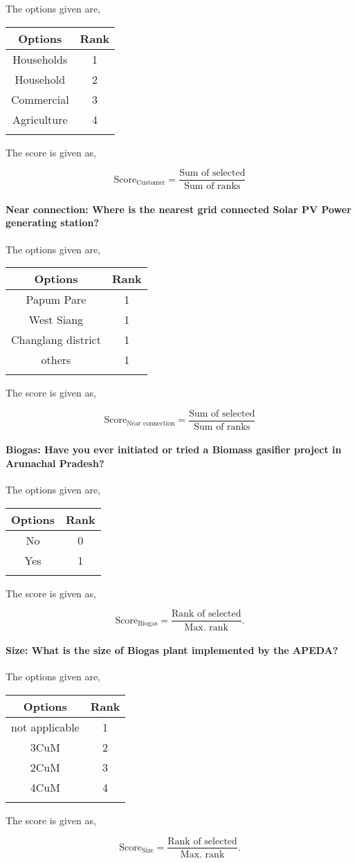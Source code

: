 \documentclass[oneside,twocolumn]{article}
\newcommand{\tsub}[2]{\text{#1}_{\text{#2}}}
\newcommand{\dsub}[2]{\dfrac{\text{#1}}{\text{#2}}}
\newcommand{\multsel}[1]
{
	\[
		\tsub{Score}{#1} = \dsub{Sum of selected}{Sum of ranks}
	\]
}
\newcommand{\singsel}[1]
{
	\[
		\tsub{Score}{#1} = \dsub{Rank of selected}{Max. rank}.
	\]
}
\newenvironment{ttable}
{
\begin{center}
\begin{tabular}{c|c}
\hline
}
{
\\ \hline
\end{tabular}
\end{center}
}
\begin{document}
The options given are,
\begin{ttable}
Options & Rank \\ \hline
Households & 1 \\
Household & 2 \\
Commercial & 3 \\
Agriculture & 4 \\
\hline
\end{ttable}
The score is given as,
\multsel{Customer}
\paragraph{Near connection: Where is the nearest grid connected Solar PV Power generating station?}

The options given are,
\begin{ttable}
Options & Rank \\ \hline
Papum Pare & 1 \\
West Siang & 1 \\
Changlang district & 1 \\
others & 1 \\
\hline
\end{ttable}
The score is given as,
\multsel{Near connection}
\paragraph{Biogas: Have you ever initiated or tried a Biomass gasifier project in Arunachal Pradesh?}

The options given are,
\begin{ttable}
Options & Rank \\ \hline
No & 0 \\
Yes & 1 \\
\hline
\end{ttable}
The score is given as,
\singsel{Biogas}
\paragraph{Size: What is the size of Biogas plant implemented by the APEDA?}

The options given are,
\begin{ttable}
Options & Rank \\ \hline
not applicable & 1 \\
3CuM & 2 \\
2CuM & 3 \\
4CuM & 4 \\
\hline
\end{ttable}
The score is given as,
\singsel{Size}
\end{document}
